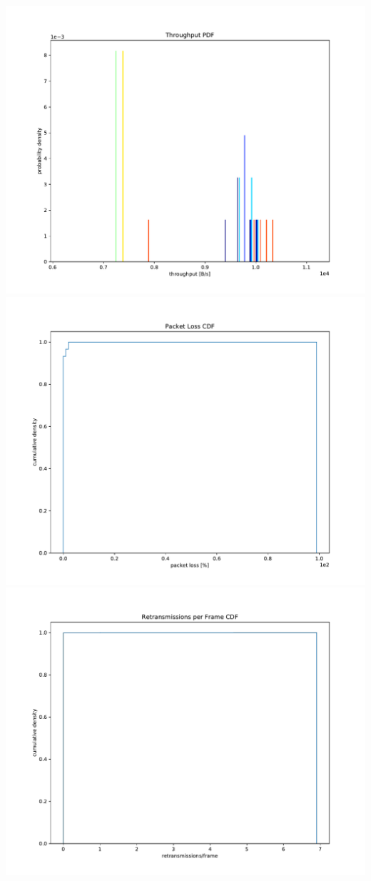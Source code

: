 \documentclass{article}
\begin{document}
	\includegraphics[width=\textwidth]{pdf/throughput_pdf}
	\includegraphics[width=\textwidth]{cdf/packet_loss_cdf}
	\includegraphics[width=\textwidth]{cdf/retransmissions_per_frame_cdf}
\end{document}
